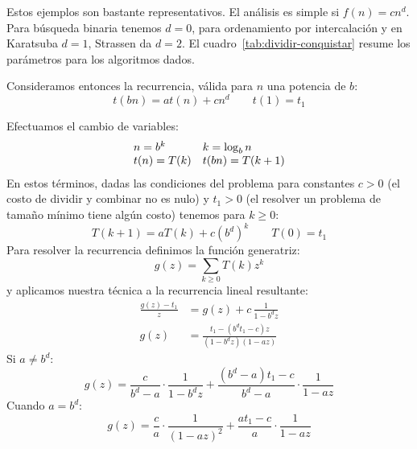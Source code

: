   Estos ejemplos son bastante representativos.
  El análisis es simple si \(f(n) = c n^d\).
  Para búsqueda binaria tenemos \(d = 0\),
  para ordenamiento por intercalación%
  y en Karatsuba \(d = 1\),
  Strassen da \(d = 2\).
  El cuadro~\ref{tab:dividir-conquistar} resume los parámetros
  para los algoritmos dados.

  Consideramos entonces la recurrencia,
  válida para \(n\) una potencia de \(b\):
  \begin{equation*}
    t(b n) = a t(n) + c n^d \qquad t(1) = t_1
  \end{equation*}

  Efectuamos el cambio de variables:
  \begin{equation*}
    \begin{array}{l@{\quad}l}
      n	   = b^k  & k	   = \log_b n \\
      t(n) = T(k) & t(b n) = T(k + 1)
    \end{array}
  \end{equation*}
  En estos términos,
  dadas las condiciones del problema
  para constantes \(c > 0\)
  (el costo de dividir y combinar no es nulo)
  y \(t_1 > 0\)
  (el resolver un problema de tamaño mínimo tiene algún costo)
  tenemos para \(k \ge 0\):
  \begin{equation*}
    T(k + 1) = a T(k) + c (b^d)^k \qquad T(0) = t_1
  \end{equation*}
  Para resolver la recurrencia
  definimos la función generatriz:
  \begin{equation*}
    g(z) = \sum_{k \ge 0} T(k) z^k
  \end{equation*}
  y aplicamos nuestra técnica a la recurrencia lineal resultante:
  \begin{align*}
    \frac{g(z) - t_1}{z}
      &= g(z) + c \, \frac{1}{1 - b^d z} \\
    g(z)
      &= \frac{t_1 - (b^d t_1 - c) z}{(1 - b^d z) (1 - a z)}
  \end{align*}
  Si \(a \ne b^d\):
  \begin{equation}
    \label{eq:DaC-ne}
    g(z)
      = \frac{c}{b^d - a} \cdot \frac{1}{1 - b^d z}
	  + \frac{(b^d - a) t_1 - c}{b^d - a}
	      \cdot \frac{1}{1 - a z}
  \end{equation}
  Cuando \(a = b^d\):
  \begin{equation}
    \label{eq:DaC-eq}
    g(z)
      = \frac{c}{a} \cdot \frac{1}{(1 - a z)^2}
	  + \frac{a t_1 - c}{a} \cdot \frac{1}{1 - a z}
  \end{equation}
